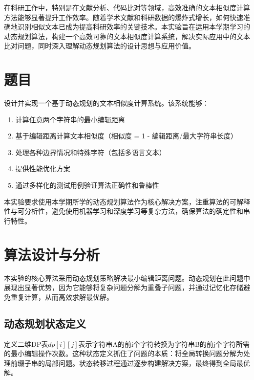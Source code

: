 \documentclass[a4paper]{article}
\begin{document}
在科研工作中，特别是在文献分析、代码比对等领域，高效准确的文本相似度计算方法能够显著提升工作效率。随着学术文献和科研数据的爆炸式增长，如何快速准确地识别相似文本已成为提高科研效率的关键技术。本实验旨在运用本学期学习的动态规划算法，构建一个高效可靠的文本相似度计算系统，解决实际应用中的文本比对问题，同时深入理解动态规划算法的设计思想与应用价值。

\section{题目}
设计并实现一个基于动态规划的文本相似度计算系统。该系统能够：
\begin{enumerate}
	\item 计算任意两个字符串的最小编辑距离
	\item 基于编辑距离计算文本相似度（相似度 = 1 - 编辑距离/最大字符串长度）
	\item 处理各种边界情况和特殊字符（包括多语言文本）
	\item 提供性能优化方案
	\item 通过多样化的测试用例验证算法正确性和鲁棒性
\end{enumerate}

本实验要求使用本学期所学的动态规划算法作为核心解决方案，注重算法的可解释性与可分析性，避免使用机器学习和深度学习等复杂方法，确保算法的确定性和串行特性。

\section{算法设计与分析}
本实验的核心算法采用动态规划策略解决最小编辑距离问题。动态规划在此问题中展现出显著优势，因为它能够将复杂问题分解为重叠子问题，并通过记忆化存储避免重复计算，从而高效求解最优解。

\subsection{动态规划状态定义}
定义二维DP表$dp[i][j]$表示字符串A的前i个字符转换为字符串B的前j个字符所需的最小编辑操作次数。这种状态定义抓住了问题的本质：将全局转换问题分解为处理前缀子串的局部问题。状态转移过程通过逐步构建解决方案，最终得到全局最优解。
\end{document}
